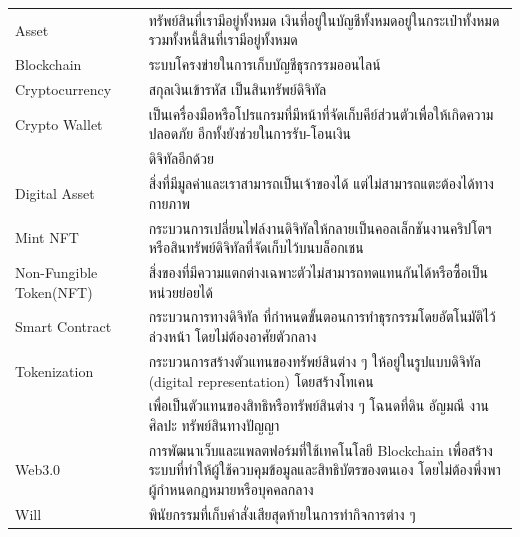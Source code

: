 \documentclass[12pt,oneside,openright,a4paper]{cpe-thai-project}
\begin{document}
%
\listofvocab
\begin{flushleft}
\begin{tabular}{@{}p{1in}@{=\extracolsep{0.5in}}l}
Asset & ทรัพย์สินที่เรามีอยู่ทั้งหมด  เงินที่อยู่ในบัญชีทั้งหมดอยู่ในกระเป๋าทั้งหมดรวมทั้งหนี้สินที่เรามีอยู่ทั้งหมด \\
Blockchain & ระบบโครงข่ายในการเก็บบัญชีธุรกรรมออนไลน์ \\
Cryptocurrency & สกุลเงินเข้ารหัส เป็นสินทรัพย์ดิจิทัล \\
Crypto Wallet & เป็นเครื่องมือหรือโปรแกรมที่มีหน้าที่จัดเก็บคีย์ส่วนตัวเพื่อให้เกิดความปลอดภัย อีกทั้งยังช่วยในการรับ-โอนเงิน\\ &ดิจิทัลอีกด้วย \\
Digital Asset & สิ่งที่มีมูลค่าและเราสามารถเป็นเจ้าของได้ แต่ไม่สามารถแตะต้องได้ทางกายภาพ\\
Mint NFT & กระบวนการเปลี่ยนไฟล์งานดิจิทัลให้กลายเป็นคอลเล็กชันงานคริปโตฯ หรือสินทรัพย์ดิจิทัลที่จัดเก็บไว้บนบล็อกเชน \\
Non-Fungible Token(NFT) & สิ่งของที่มีความแตกต่างเฉพาะตัวไม่สามารถทดแทนกันได้หรือซื้อเป็นหน่วยย่อยได้\\
Smart Contract & กระบวนการทางดิจิทัล ที่กำหนดขั้นตอนการทำธุรกรรมโดยอัตโนมัติไว้ล่วงหน้า โดยไม่ต้องอาศัยตัวกลาง\\
Tokenization &  กระบวนการสร้างตัวแทนของทรัพย์สินต่าง ๆ ให้อยู่ในรูปแบบดิจิทัล (digital 
representation) โดยสร้างโทเคน\\ &เพื่อเป็นตัวแทนของสิทธิหรือทรัพย์สินต่าง ๆ โฉนดที่ดิน อัญมณี 
งานศิลปะ ทรัพย์สินทางปัญญา\\
Web3.0 & การพัฒนาเว็บและแพลตฟอร์มที่ใช้เทคโนโลยี Blockchain เพื่อสร้างระบบที่ทำให้ผู้ใช้ควบคุมข้อมูลและสิทธิบัตรของตนเอง โดยไม่ต้องพึ่งพาผู้กำหนดกฎหมายหรือบุคคลกลาง\\
Will  & พินัยกรรมที่เก็บคำสั่งเสียสุดท้ายในการทำกิจการต่าง ๆ \\

\end{tabular}
\end{flushleft}

\end{document}
